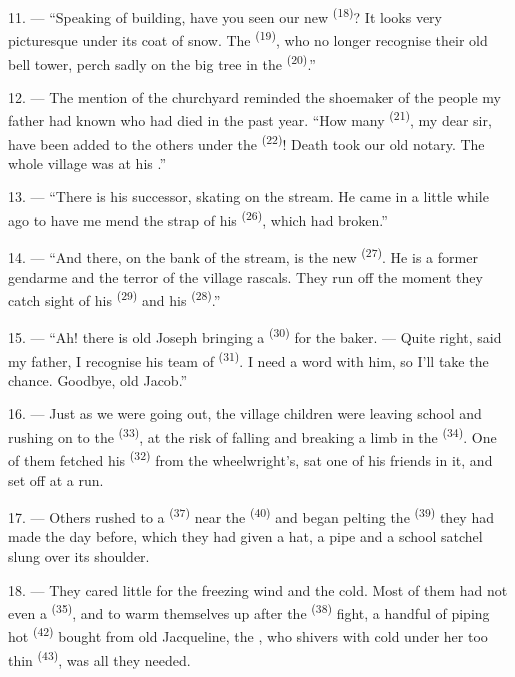 11. --- “Speaking of building, have you seen our new  \textsuperscript{(18)}?
It looks very picturesque under its coat of snow. The
 \textsuperscript{(19)}, who no longer recognise their old bell tower,
perch sadly on the big tree in the  \textsuperscript{(20)}.”

12. --- The mention of the churchyard reminded the shoemaker of the people my father had known
who had died in the past year. “How many  \textsuperscript{(21)}, my dear sir,
have been added to the others under the
 \textsuperscript{(22)}! Death took our old notary. The whole
village was at his .”

13. --- “There is his successor, skating on the stream. He came in a little while ago to have
me mend the strap of his  \textsuperscript{(26)}, which had broken.”

14. --- “And there, on the bank of the stream, is the new
 \textsuperscript{(27)}. He is a former gendarme and the
terror of the village rascals. They run off the moment they catch sight of his
 \textsuperscript{(29)} and his  \textsuperscript{(28)}.”

15. --- “Ah! there is old Joseph bringing a 
\textsuperscript{(30)} for the baker. --- Quite right, said my father, I recognise his team of
 \textsuperscript{(31)}. I need a word with him, so I'll take the chance.
Goodbye, old Jacob.”

16. --- Just as we were going out, the village children were leaving school and rushing on to
the  \textsuperscript{(33)}, at the risk of falling and breaking a limb in
the  \textsuperscript{(34)}. One of them fetched his 
\textsuperscript{(32)} from the wheelwright's, sat one of his friends in it, and set off at a
run.

17. --- Others rushed to a  \textsuperscript{(37)} near the
 \textsuperscript{(40)} and began pelting the 
\textsuperscript{(39)} they had made the day before, which they had given a hat, a pipe and a
school satchel slung over its shoulder.

18. --- They cared little for the freezing wind and the cold. Most of them had not even a
 \textsuperscript{(35)}, and to warm themselves up after the 
\textsuperscript{(38)} fight, a handful of piping hot
 \textsuperscript{(42)} bought from old Jacqueline, the
, who shivers with cold under her too thin 
\textsuperscript{(43)}, was all they needed.

